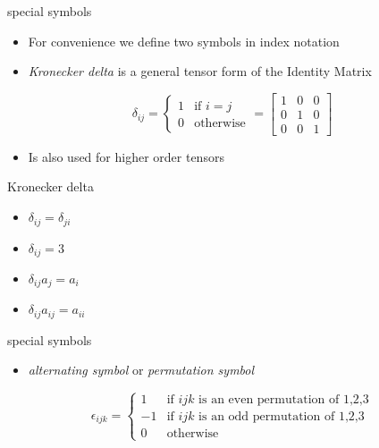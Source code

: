 \documentclass[
  letterpaper,
  ignorenonframetext,
  aspectratio=43,
  handout,
  12pt]{beamer}
\providecommand{\tightlist}{%
  \setlength{\itemsep}{0pt}\setlength{\parskip}{0pt}}
\providecommand{\tightlist}{%
\setlength{\itemsep}{0pt}\setlength{\parskip}{0pt}}
\begin{document}
\begin{frame}{special symbols}
\protect\hypertarget{special-symbols}{}
\begin{itemize}
\tightlist
\item
  For convenience we define two symbols in index notation
\item
  \emph{Kronecker delta} is a general tensor form of the Identity Matrix
\end{itemize}

\[\delta_{ij} = \left\{
\begin{array}{ll}
1& \text{if $i=j$}\\
0& \text{otherwise}
\end{array}
\right. = \begin{bmatrix}
1 & 0 & 0\\
0 & 1 & 0 \\
0 & 0 & 1
\end{bmatrix}\]

\begin{itemize}
\tightlist
\item
  Is also used for higher order tensors
\end{itemize}
\end{frame}

\begin{frame}{Kronecker delta}
\protect\hypertarget{kronecker-delta}{}
\begin{itemize}
\tightlist
\item
  \(\delta_{ij} = \delta_{ji}\)
\item
  \(\delta_{ij} = 3\)
\item
  \(\delta_{ij} a_j = a_i\)
\item
  \(\delta_{ij}a_{ij} = a_{ii}\)
\end{itemize}
\end{frame}

\begin{frame}{special symbols}
\protect\hypertarget{special-symbols-1}{}
\begin{itemize}
\tightlist
\item
  \emph{alternating symbol} or \emph{permutation symbol}
\end{itemize}

\[\epsilon_{ijk} = \left\{
\begin{array}{rl}
1 & \text{if $ijk$ is an even permutation of 1,2,3}\\
-1 & \text{if $ijk$ is an odd permutation of 1,2,3}\\
0 & \text{otherwise}
\end{array}
\right.\]
\end{frame}
\end{document}
